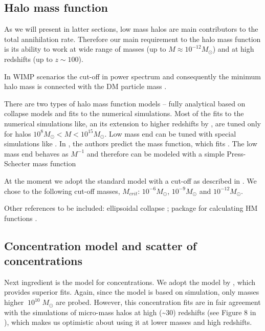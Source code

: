 \subsection{Halo mass function}

As we will present in latter sections, low mass halos are main contributors to the total annihilation rate. Therefore our main requirement to the halo mass function is its ability to work at wide range of masses (up to $M \approx 10^{-12}M_\odot$) and at high redshifts (up to $z \sim 100$). 

In WIMP scenarios the cut-off in power spectrum and consequently the minimum halo mass is connected with the DM particle mass \cite{Green_2004}. 

There are two types of halo mass function models -- fully analytical based on collapse models and fits to the numerical simulations. Most of the fits to the numerical simulations like, \citet{Tinker_2008} an its extension to higher redshifts by \citet{Behroozi_2013}, are tuned only for halos $10^{8}M_\odot < M < 10^{15}M_\odot$. Low mass end can be tuned with special simulations like \citet{Diemand_2005}. In \citet{Schneider_2013}, the authors predict the mass function, which fits \citet{Diemand_2005}. The low mass end behaves as $M^{-1}$ and therefore can be modeled with a simple Press-Schecter mass function \citet{Press_1974}

At the moment we adopt the standard \citet{Press_1974} model with a cut-off as described in \citet{Diemand_2005}. We chose to the following cut-off masses, $M_{crit}$: $10^{-6}M_\odot$, $10^{-9}M_\odot$ and $10^{-12}M_\odot$.

Other references to be included:
ellipsoidal collapse \citep{Sheth_2001}; package for calculating HM functions \cite{Murray_2013}.

\subsection{Concentration model and scatter of concentrations}

Next ingredient is the model for concentrations. We adopt the model by \citet{Diemer_2015}, which provides superior fits. Again, since the model is based on simulation, only masses higher $~10^{10}\;M_\odot$ are probed. However, this concentration fits are in fair agreement with the simulations of micro-mass halos at high (\sim30) redshifts (see Figure 8 in \citet{Diemer_2015}), which makes us optimistic about using it at lower masses and high redshifts.

